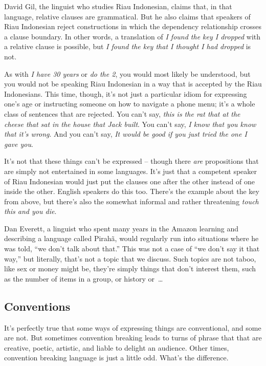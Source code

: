 David Gil, the linguist who studies Riau Indonesian, claims that, in that language, relative clauses are grammatical. But he also claims that speakers of Riau Indonesian reject constructions in which the dependency relationship crosses a clause boundary. In other words, a translation of \textit{I found the key I dropped} with a relative clause is possible, but \textit{I found the key that I thought I had dropped} is not. 

As with \textit{I have 30 years} or \textit{do the 2}, you would most likely be understood, but you would not be speaking Riau Indonesian in a way that is accepted by the Riau Indonesians. This time, though, it's not just a particular idiom for expressing one's age or instructing someone on how to navigate a phone menu; it's a whole class of sentences that are rejected. You can't say, \textit{this is the rat that at the cheese that sat in the house that Jack built}. You can't say, \textit{I know that you know that it's wrong}. And you can't say, \textit{It would be good if you just tried the one I gave you}. 

It's not that these things can't be expressed -- though there \textit{are} propositions that are simply not entertained in some languages. It's just that a competent speaker of Riau Indonesian would just put the clauses one after the other instead of one inside the other. English speakers do this too. There's the example about the key from above, but there's also the somewhat informal and rather threatening \textit{touch this and you die}.

Dan Everett, a linguist who spent many years in the Amazon learning and describing a language called Pirahã, would regularly run into situations where he was told, ``we don't talk about that.'' This was not a case of ``we don't say it that way,'' but literally, that's not a topic that we discuss. Such topics are not taboo, like sex or money might be, they're simply things that don't interest them, such as the number of items in a group, or history or~\dots

\subsection{Conventions}

It's perfectly true that some ways of expressing things are conventional, and some are not. But sometimes convention breaking leads to turns of phrase that that are creative, poetic, artistic, and liable to delight an audience. Other times, convention breaking language is just a little odd. What's the difference.

